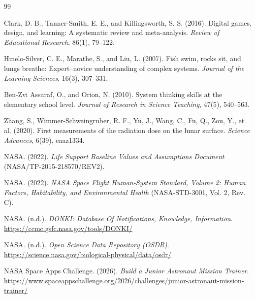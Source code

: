 \documentclass[11pt,a4paper]{article}
\begin{document}
\begin{thebibliography}{99}

Clark, D. B., Tanner-Smith, E. E., and Killingsworth, S. S. (2016).
\newblock Digital games, design, and learning: A systematic review and meta-analysis.
\newblock \emph{Review of Educational Research}, 86(1), 79--122.

Hmelo-Silver, C. E., Marathe, S., and Liu, L. (2007).
\newblock Fish swim, rocks sit, and lungs breathe: Expert--novice understanding of complex systems.
\newblock \emph{Journal of the Learning Sciences}, 16(3), 307--331.

Ben-Zvi Assaraf, O., and Orion, N. (2010).
\newblock System thinking skills at the elementary school level.
\newblock \emph{Journal of Research in Science Teaching}, 47(5), 540--563.

Zhang, S., Wimmer-Schweingruber, R. F., Yu, J., Wang, C., Fu, Q., Zou, Y., et al. (2020).
\newblock First measurements of the radiation dose on the lunar surface.
\newblock \emph{Science Advances}, 6(39), eaaz1334.

NASA. (2022).
\newblock \emph{Life Support Baseline Values and Assumptions Document} (NASA/TP-2015-218570/REV2).

NASA. (2022).
\newblock \emph{NASA Space Flight Human-System Standard, Volume 2: Human Factors, Habitability, and Environmental Health} (NASA-STD-3001, Vol. 2, Rev. C).

NASA. (n.d.).
\newblock \emph{DONKI: Database Of Notifications, Knowledge, Information}.
\newblock \url{https://ccmc.gsfc.nasa.gov/tools/DONKI/}

NASA. (n.d.).
\newblock \emph{Open Science Data Repository (OSDR)}.
\newblock \url{https://science.nasa.gov/biological-physical/data/osdr/}

NASA Space Apps Challenge. (2026).
\newblock \emph{Build a Junior Astronaut Mission Trainer}.
\newblock \url{https://www.spaceappschallenge.org/2026/challenges/junior-astronaut-mission-trainer/}

\end{thebibliography}
\end{document}
